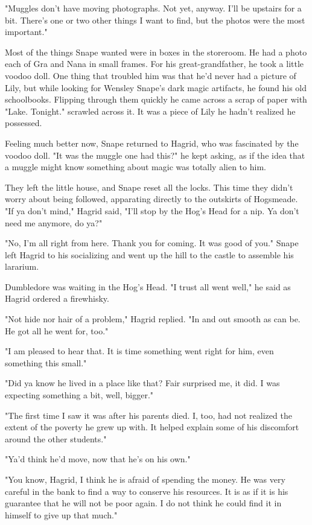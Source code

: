 "Muggles don't have moving photographs. Not yet, anyway. I'll be upstairs for a bit. There's one or two other things I want to find, but the photos were the most important."

Most of the things Snape wanted were in boxes in the storeroom. He had a photo each of Gra and Nana in small frames. For his great-grandfather, he took a little voodoo doll. One thing that troubled him was that he'd never had a picture of Lily, but while looking for Wensley Snape's dark magic artifacts, he found his old schoolbooks. Flipping through them quickly he came across a scrap of paper with "Lake. Tonight." scrawled across it. It was a piece of Lily he hadn't realized he possessed.

Feeling much better now, Snape returned to Hagrid, who was fascinated by the voodoo doll. "It was the muggle one had this?" he kept asking, as if the idea that a muggle might know something about magic was totally alien to him.

They left the little house, and Snape reset all the locks. This time they didn't worry about being followed, apparating directly to the outskirts of Hogsmeade. "If ya don't mind," Hagrid said, "I'll stop by the Hog's Head for a nip. Ya don't need me anymore, do ya?"

"No, I'm all right from here. Thank you for coming. It was good of you." Snape left Hagrid to his socializing and went up the hill to the castle to assemble his lararium.

Dumbledore was waiting in the Hog's Head. "I trust all went well," he said as Hagrid ordered a firewhisky.

"Not hide nor hair of a problem," Hagrid replied. "In and out smooth as can be. He got all he went for, too."

"I am pleased to hear that. It is time something went right for him, even something this small."

"Did ya know he lived in a place like that? Fair surprised me, it did. I was expecting something a bit, well, bigger."

"The first time I saw it was after his parents died. I, too, had not realized the extent of the poverty he grew up with. It helped explain some of his discomfort around the other students."

"Ya'd think he'd move, now that he's on his own."

"You know, Hagrid, I think he is afraid of spending the money. He was very careful in the bank to find a way to conserve his resources. It is as if it is his guarantee that he will not be poor again. I do not think he could find it in himself to give up that much."

